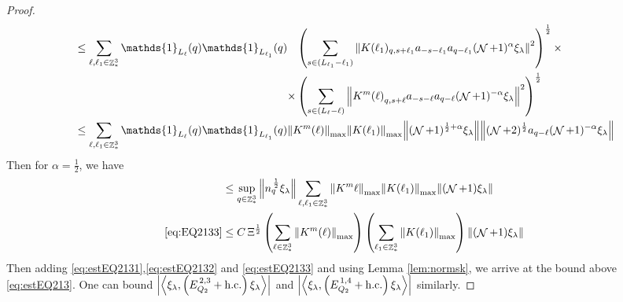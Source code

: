\documentclass[12pt,a4paper]{article}
\numberwithin{equation}{section}
\newcommand{\1}{\mathbb{I}}
\DeclareMathOperator{\Z}{\mathbb{Z}}
\DeclareMathOperator{\NN}{\mathcal{N}}
\newcommand{\half}{\frac{1}{2}}
\newcommand{\eva}[1]{\left\langle #1 \right\rangle}
\theoremstyle{plain}
\theoremstyle{definition}
\theoremstyle{remark}
\theoremstyle{plain}
\theoremstyle{definition}
\theoremstyle{remark}
\begin{document}
\begin{proof}
\begin{align}
    &\leq \sum\limits_{\ell, \ell_1\in \Z^3_*} \mathds{1}_{L_{\ell}}(q) \mathds{1}_{L_{\ell_1}}(q) \begin{aligned}[t]&\left(\sum\limits_{ s \in  (L_{\ell_1}-\ell_1)} \norm{K(\ell_1)_{q,s+\ell_1} a_{-s-\ell_1} a_{q-\ell_1}  (\NN+1)^{\alpha}\xi_\lambda}^2\right)^\half \times \nonumber\\ \times &\left( \sum\limits_{ s \in (L_{\ell}-\ell) } \norm{ K^m{(\ell)}_{q,s+\ell}  a_{-s-\ell} a_{q-\ell} (\NN+1)^{-\alpha} \xi_\lambda }^2\right)^\half \end{aligned}\nonumber\\
    &\leq \sum\limits_{\ell, \ell_1\in \Z^3_*} \mathds{1}_{L_{\ell}}(q) \mathds{1}_{L_{\ell_1}}(q) \norm{K^m{(\ell)}}_{\max} \norm{K(\ell_1)}_{\max} \norm{ (\NN+1)^{\half+\alpha}\xi_\lambda} \norm{  (\NN+2)^\half  a_{q-\ell} (\NN+1)^{-\alpha} \xi_\lambda } \nonumber
\end{align} 
Then for $\alpha = \half$, we have
\begin{align}
	&\leq  \sup\limits_{q \in \Z^3_*} \norm{ n_{q}^{\,\half} \xi_\lambda } \sum\limits_{\ell, \ell_1\in \Z^3_*}  \norm{K^m{\ell}}_{\max} \norm{K(\ell_1)}_{\max} \norm{ (\NN+1) \xi_\lambda}  \nonumber\\
	\eqref{eq:EQ2133}&\leq C\, \Xi^\half \left(\sum\limits_{\ell\in \Z^3_*} \norm{K^m(\ell)}_{\max}\right)\left(  \sum\limits_{ \ell_1\in \Z^3_*}  \norm{ K(\ell_1)}_{\max} \right) \norm{ (\NN+1) \xi_\lambda}\label{eq:estEQ2133} 
\end{align}
Then adding \eqref{eq:estEQ2131},\eqref{eq:estEQ2132} and \eqref{eq:estEQ2133} and using Lemma \ref{lem:normsk}, we arrive at the bound above \eqref{eq:estEQ213}. One can bound $\abs{\eva{\xi_\lambda,\left(E^{\,2,3}_{Q_2}+\mathrm{h.c.}\right) \xi_\lambda }}$ and $\abs{\eva{\xi_\lambda,\left(E^{\,1,4}_{Q_2}+\mathrm{h.c.}\right) \xi_\lambda }}$ similarly.
\end{proof}
\end{document}
